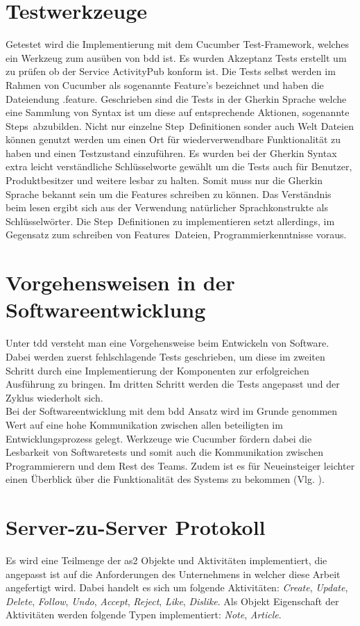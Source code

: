 \section{Testwerkzeuge}
Getestet wird die Implementierung mit dem Cucumber Test-Framework, welches ein Werkzeug zum ausüben von \gls{bdd} ist. Es wurden Akzeptanz Tests erstellt um zu prüfen ob der Service ActivityPub konform ist. Die Tests selbst werden im Rahmen von Cucumber als sogenannte \glqq Feature\grqq's bezeichnet und haben die Dateiendung \glqq .feature\grqq. Geschrieben sind die Tests in der Gherkin Sprache welche eine Sammlung von Syntax ist um diese auf entsprechende Aktionen, sogenannte \glqq Steps\grqq~abzubilden. Nicht nur einzelne \glqq Step\grqq~Definitionen sonder auch Welt Dateien können genutzt werden um einen Ort für wiederverwendbare Funktionalität zu haben und einen Testzustand einzuführen. Es wurden bei der Gherkin Syntax extra leicht verständliche Schlüsselworte gewählt um die Tests auch für Benutzer, Produktbesitzer und weitere lesbar zu halten. Somit muss nur die Gherkin Sprache bekannt sein um die Features schreiben zu können. Das Verständnis beim lesen ergibt sich aus der Verwendung natürlicher Sprachkonstrukte als Schlüsselwörter. Die \glqq Step\grqq~Definitionen zu implementieren setzt allerdings, im Gegensatz zum schreiben von \glqq Features\grqq~Dateien, Programmierkenntnisse voraus.\\

\section{Vorgehensweisen in der Softwareentwicklung}
Unter \gls{tdd} versteht man eine Vorgehensweise beim Entwickeln von Software. Dabei werden zuerst fehlschlagende Tests geschrieben, um diese im zweiten Schritt durch eine Implementierung der Komponenten zur erfolgreichen Ausführung zu bringen. Im dritten Schritt werden die Tests angepasst und der Zyklus wiederholt sich.\\

Bei der Softwareentwicklung mit dem \gls{bdd} Ansatz wird im Grunde genommen Wert auf eine hohe Kommunikation zwischen allen beteiligten im Entwicklungsprozess gelegt. Werkzeuge wie Cucumber fördern dabei die Lesbarkeit von Softwaretests und somit auch die Kommunikation zwischen Programmierern und dem Rest des Teams. Zudem ist es für Neueinsteiger leichter einen Überblick über die Funktionalität des Systems zu bekommen (Vlg. \cite{cucumber}).
\section{Server-zu-Server Protokoll}
\label{sec:server-zu-server-prot}
Es wird eine Teilmenge der \gls{as2} Objekte und Aktivitäten implementiert, die angepasst ist auf die Anforderungen des Unternehmens in welcher diese Arbeit angefertigt wird. Dabei handelt es sich um folgende Aktivitäten: \textit{Create}, \textit{Update}, \textit{Delete}, \textit{Follow}, \textit{Undo}, \textit{Accept}, \textit{Reject}, \textit{Like}, \textit{Dislike}. Als Objekt Eigenschaft der Aktivitäten werden folgende Typen implementiert: \textit{Note}, \textit{Article}.\\


